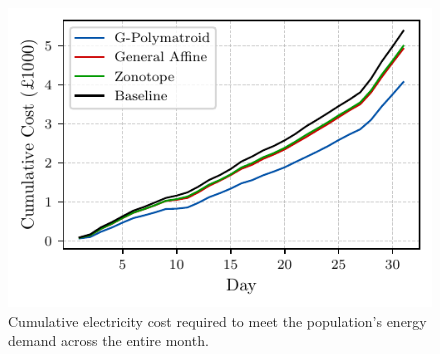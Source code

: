 \begin{figure}[t]
    \centering
    \includegraphics[width=\columnwidth]{./figures/cumulative.pdf}
    \caption{Cumulative electricity cost required to meet the population’s energy demand across the entire month.}
    \label{fig:case_study}
\end{figure}
